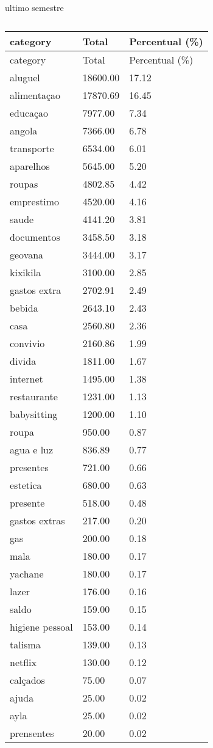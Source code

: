 \documentclass[
  8pt,
  a4paper,
  DIV=11,
  numbers=noendperiod]{scrartcl}
\begin{document}
\begin{figure}
\begin{minipage}{0.50\linewidth}
\end{minipage}%
%
\begin{minipage}{0.50\linewidth}
ultimo semestre

\begin{longtable}[]{@{}lll@{}}
\caption{}\label{T_a9280}\tabularnewline
\toprule\noalign{}
category & Total & Percentual (\%) \\
\midrule\noalign{}
\endfirsthead
\toprule\noalign{}
category & Total & Percentual (\%) \\
\midrule\noalign{}
\endhead
\bottomrule\noalign{}
\endlastfoot
aluguel & 18600.00 & 17.12 \\
alimentaçao & 17870.69 & 16.45 \\
educaçao & 7977.00 & 7.34 \\
angola & 7366.00 & 6.78 \\
transporte & 6534.00 & 6.01 \\
aparelhos & 5645.00 & 5.20 \\
roupas & 4802.85 & 4.42 \\
emprestimo & 4520.00 & 4.16 \\
saude & 4141.20 & 3.81 \\
documentos & 3458.50 & 3.18 \\
geovana & 3444.00 & 3.17 \\
kixikila & 3100.00 & 2.85 \\
gastos extra & 2702.91 & 2.49 \\
bebida & 2643.10 & 2.43 \\
casa & 2560.80 & 2.36 \\
convivio & 2160.86 & 1.99 \\
divida & 1811.00 & 1.67 \\
internet & 1495.00 & 1.38 \\
restaurante & 1231.00 & 1.13 \\
babysitting & 1200.00 & 1.10 \\
roupa & 950.00 & 0.87 \\
agua e luz & 836.89 & 0.77 \\
presentes & 721.00 & 0.66 \\
estetica & 680.00 & 0.63 \\
presente & 518.00 & 0.48 \\
gastos extras & 217.00 & 0.20 \\
gas & 200.00 & 0.18 \\
mala & 180.00 & 0.17 \\
yachane & 180.00 & 0.17 \\
lazer & 176.00 & 0.16 \\
saldo & 159.00 & 0.15 \\
higiene pessoal & 153.00 & 0.14 \\
talisma & 139.00 & 0.13 \\
netflix & 130.00 & 0.12 \\
calçados & 75.00 & 0.07 \\
ajuda & 25.00 & 0.02 \\
ayla & 25.00 & 0.02 \\
prensentes & 20.00 & 0.02 \\
\end{longtable}


\end{minipage}
\end{figure}
\end{document}
